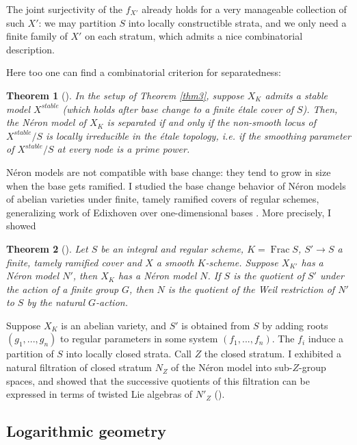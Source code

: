 \documentclass[12pt]{extarticle}
\newtheorem{theorem}{Theorem}
\begin{document}
The joint surjectivity of the $f_{X'}$ already holds for a very manageable collection of such $X'$: we may partition $S$ into locally constructible strata, and we only need a finite family of $X'$ on each stratum, which admits a nice combinatorial description.

Here too one can find a combinatorial criterion for separatedness:

\begin{theorem}[{\cite[Theorem 7.48]{PoiretThesis}}]
	In the setup of Theorem \ref{thm3}, suppose $X_K$ admits a stable model $X^{stable}$ (which holds after base change to a finite \'etale cover of $S$). Then, the N\'eron model of $X_K$ is separated if and only if the non-smooth locus of $X^{stable}/S$ is locally irreducible in the \'etale topology, i.e. if the smoothing parameter of $X^{stable}/S$ at every node is a prime power.
\end{theorem}

N\'eron models are not compatible with base change: they tend to grow in size when the base gets ramified. I studied the base change behavior of N\'eron models of abelian varieties under finite, tamely ramified covers of regular schemes, generalizing work of Edixhoven over one-dimensional bases \cite{EdixNeronTameRamif}. More precisely, I showed
\begin{theorem}[{\cite[Theorem 10.5]{PoiretThesis}}]
	Let $S$ be an integral and regular scheme, $K=\operatorname{Frac}S$, $S' \to S$ a finite, tamely ramified cover and $X$ a smooth $K$-scheme. Suppose $X_{K'}$ has a N\'eron model $N'$, then $X_K$ has a N\'eron model $N$. If $S$ is the quotient of $S'$ under the action of a finite group $G$, then $N$ is the quotient of the Weil restriction of $N'$ to $S$ by the natural $G$-action.
\end{theorem}

Suppose $X_K$ is an abelian variety, and $S'$ is obtained from $S$ by adding roots $(g_1,...,g_n)$ to regular parameters in some system $(f_1,...,f_n)$. The $f_i$ induce a partition of $S$ into locally closed strata. Call $Z$ the closed stratum. I exhibited a natural filtration of closed stratum $N_Z$ of the N\'eron model into sub-$Z$-group spaces, and showed that the successive quotients of this filtration can be expressed in terms of twisted Lie algebras of $N'_Z$ (\cite[Theorem 10.13]{PoiretThesis}).

\subsection*{Logarithmic geometry}
\end{document}
